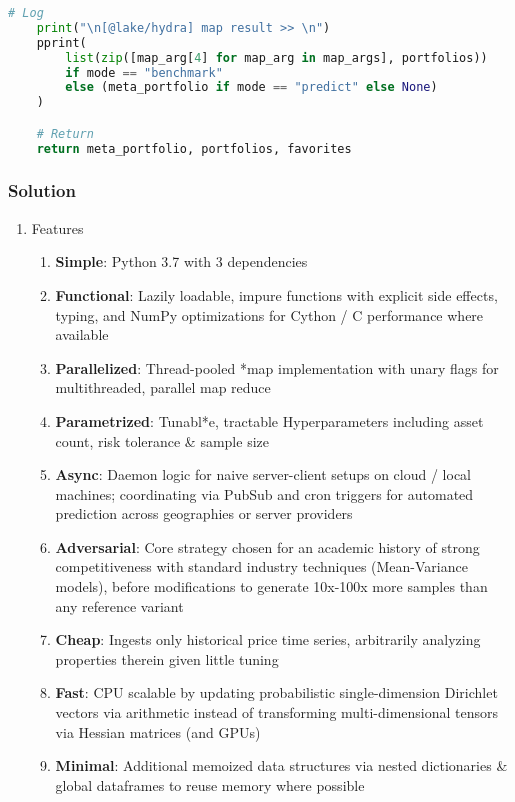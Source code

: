 \documentclass[11pt, a4paper]{awesome-cv}
\begin{document}
\begin{cvletter}
\begin{lstlisting}[language=Python, caption=Python example]
    # Log
    print("\n[@lake/hydra] map result >> \n")
    pprint(
        list(zip([map_arg[4] for map_arg in map_args], portfolios))
        if mode == "benchmark"
        else (meta_portfolio if mode == "predict" else None)
    )

    # Return
    return meta_portfolio, portfolios, favorites

\end{lstlisting}


\subsubsection{Solution}

\begin{enumerate}
\item Features
\begin{enumerate}
\item \textbf{\textbf{Simple}}: Python 3.7 with 3 dependencies
\item \textbf{\textbf{Functional}}: Lazily loadable, impure functions with explicit side effects, typing, and NumPy optimizations for Cython / C performance where available
\item \textbf{\textbf{Parallelized}}: Thread-pooled *map implementation with unary flags for multithreaded, parallel map reduce
\item \textbf{\textbf{Parametrized}}: Tunabl*e, tractable Hyperparameters including asset count, risk tolerance \& sample size
\item \textbf{\textbf{Async}}: Daemon logic for naive server-client setups on cloud / local machines; coordinating via PubSub and cron triggers for automated prediction across geographies or server providers
\item \textbf{\textbf{Adversarial}}: Core strategy chosen for an academic history of strong competitiveness with standard industry techniques (Mean-Variance models), before modifications to generate 10x-100x more samples than any reference variant
\item \textbf{\textbf{Cheap}}: Ingests only historical price time series, arbitrarily analyzing properties therein given little tuning
\item \textbf{\textbf{Fast}}: CPU scalable by updating probabilistic single-dimension Dirichlet vectors via arithmetic instead of transforming multi-dimensional tensors via Hessian matrices (and GPUs)
\item \textbf{\textbf{Minimal}}: Additional memoized data structures via nested dictionaries \& global dataframes to reuse memory where possible

\end{enumerate}
\end{enumerate}
\end{cvletter}
\end{document}
